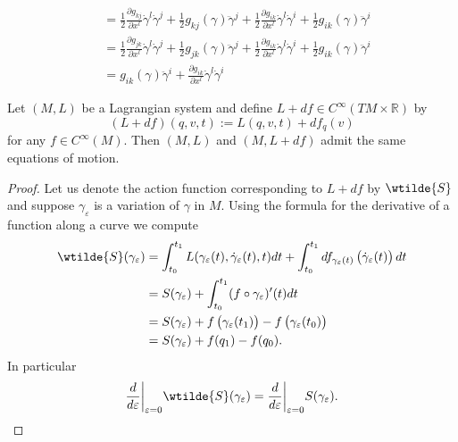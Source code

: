 \begin{example}
\begin{align*}
		&= \frac{1}{2}\frac{\partial g_{kj}}{\partial x^l}\dot{\gamma}^l\dot{\gamma}^j + \frac{1}{2}g_{kj}(\gamma)\ddot{\gamma}^j + \frac{1}{2}\frac{\partial g_{ik}}{\partial x^l}\dot{\gamma}^l\dot{\gamma}^i + \frac{1}{2}g_{ik}(\gamma)\ddot{\gamma}^i\\
		&= \frac{1}{2}\frac{\partial g_{jk}}{\partial x^l}\dot{\gamma}^l\dot{\gamma}^j + \frac{1}{2}g_{jk}(\gamma)\ddot{\gamma}^j + \frac{1}{2}\frac{\partial g_{ik}}{\partial x^l}\dot{\gamma}^l\dot{\gamma}^i + \frac{1}{2}g_{ik}(\gamma)\ddot{\gamma}^i\\
		&= g_{ik}(\gamma)\ddot{\gamma}^i + \frac{\partial g_{ik}}{\partial x^l}\dot{\gamma}^l\dot{\gamma}^i
	\end{align*}
\end{example}

\begin{lemma}
	\label{prop:same_equations_of_motion}
	Let $(M,L)$ be a Lagrangian system and define $L + df \in C^\infty(TM \times \mathbb{R})$ by
	\begin{equation*}
		(L + df)(q,v,t) := L(q,v,t) + df_q(v)
	\end{equation*}
	\noindent for any $f \in C^\infty(M)$. Then $(M,L)$ and $(M,L + df)$ admit the same equations of motion.
\end{lemma}

\begin{proof}
	Let us denote the action function corresponding to $L + df$ by $\wtilde{S}$ and suppose $\gamma_\varepsilon$ is a variation of $\gamma$ in $M$. Using the formula for the derivative of a function along a curve \cite[283]{lee:smooth_manifolds:2013} we compute
	\begin{align*}
		\wtilde{S}(\gamma_\varepsilon) &= \int_{t_0}^{t_1}L(\gamma_\varepsilon(t),\dot{\gamma}_\varepsilon(t),t)dt + \int_{t_0}^{t_1}df_{\gamma_\varepsilon(t)}\del[1]{\dot{\gamma}_\varepsilon(t)}dt\\
		&= S(\gamma_\varepsilon) + \int_{t_0}^{t_1}(f \circ \gamma_\varepsilon)'(t)dt\\
		&= S(\gamma_\varepsilon) + f\del[1]{\gamma_\varepsilon(t_1)} - f\del[1]{\gamma_{\varepsilon}(t_0)}\\
		&= S(\gamma_\varepsilon) + f(q_1) - f(q_0).
	\end{align*}
	In particular
	\begin{equation*}
		\frac{d}{d\varepsilon}\bigg\vert_{\varepsilon = 0}\wtilde{S}(\gamma_\varepsilon) = \frac{d}{d\varepsilon}\bigg\vert_{\varepsilon = 0}S(\gamma_\varepsilon).
	\end{equation*}
\end{proof}
